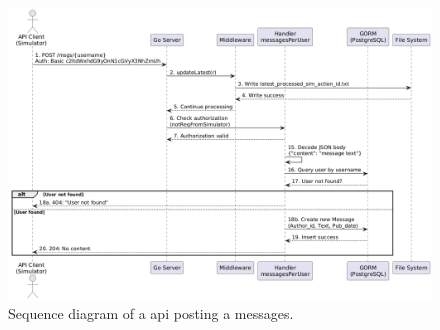 \begin{figure}[H]
\includegraphics[width=\textwidth]{images/api-seq-diagram.png}
\centering
\caption{Sequence diagram of a api posting a messages.}
\label{fig:api-seq}
\end{figure}
